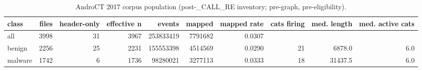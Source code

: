 \begin{table}[ht]
\centering
\caption{AndroCT 2017 corpus population (post-\_CALL\_RE inventory; pre-graph, pre-eligibility).}
\label{tab:t1-corpus}
\begin{tabular}{lrrrrrrrrr}
\toprule
class & files & header-only & effective n & events & mapped & mapped rate & cats firing & med. length & med. active cats \\
\midrule
all & 3998 & 31 & 3967 & 253833419 & 7791682 & 0.0307 &  &  &  \\
benign & 2256 & 25 & 2231 & 155553398 & 4514569 & 0.0290 & 21 & 6878.0 & 6.0 \\
malware & 1742 & 6 & 1736 & 98280021 & 3277113 & 0.0333 & 18 & 31437.5 & 6.0 \\
\bottomrule
\end{tabular}
\end{table}
